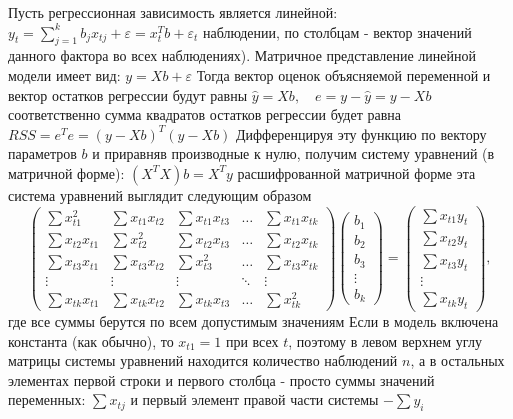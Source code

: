 \documentclass[a4paper, 12pt]{article}
\begin{document}
	Пусть регрессионная зависимость является линейной:
	$y_{t}=\sum_{j=1}^{k} b_{j} x_{t j}+\varepsilon=x_{t}^{T} b+\varepsilon_{t}$
	наблюдении, по столбцам - вектор значений данного фактора во всех наблюдениях). Матричное представление линейной модели имеет вид:
	$y=X b+\varepsilon$
	Тогда вектор оценок объясняемой переменной и вектор остатков регрессии будут равны
	$\hat{y}=X b, \quad e=y-\hat{y}=y-X b$
	соответственно сумма квадратов остатков регрессии будет равна $R S S=e^{T} e=(y-X b)^{T}(y-X b)$
	Дифференцируя эту функцию по вектору параметров $b$ и приравняв производные к нулю, получим систему уравнений (в матричной форме):
	$\left(X^{T} X\right) b=X^{T} y$
	расшифрованной матричной форме эта система уравнений выглядит следующим образом 
	\begin{equation*}
		\left(\begin{array}{ccccc}\sum x_{t 1}^{2} & \sum x_{t 1} x_{t 2} & \sum x_{t 1} x_{t 3} & \ldots & \sum x_{t 1} x_{t k} \\ \sum x_{t 2} x_{t 1} & \sum x_{t 2}^{2} & \sum x_{t 2} x_{t 3} & \ldots & \sum x_{t 2} x_{t k} \\ \sum x_{t 3} x_{t 1} & \sum x_{t 3} x_{t 2} & \sum x_{t 3}^{2} & \ldots & \sum x_{t 3} x_{t k} \\ \vdots & \vdots & \vdots & \ddots & \vdots \\ \sum x_{t k} x_{t 1} & \sum x_{t k} x_{t 2} & \sum x_{t k} x_{t 3} & \ldots & \sum x_{t k}^{2}\end{array}\right)\left(\begin{array}{c}b_{1} \\ b_{2} \\ b_{3} \\ \vdots \\ b_{k}\end{array}\right)=\left(\begin{array}{c}\sum x_{t 1} y_{t} \\ \sum x_{t 2} y_{t} \\ \sum x_{t 3} y_{t} \\ \vdots \\ \sum x_{t k} y_{t}\end{array}\right),
	\end{equation*}
	где все суммы берутся по всем допустимым значениям
	Если в модель включена константа (как обычно), то $x_{t 1}=1$ при всех $t$, поэтому в левом верхнем углу матрицы системы уравнений находится количество наблюдений $n$, а в остальных элементах первой строки и первого столбца - просто суммы значений переменных: $\sum x_{t j}$ и первый элемент правой части системы $-\sum y_{i}$
\end{document}
